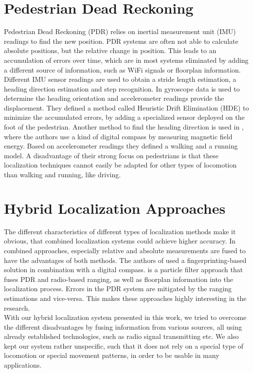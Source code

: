 \section{Pedestrian Dead Reckoning}
Pedestrian Dead Reckoning (PDR) relies on inertial measurement unit (IMU) readings to find the new position. PDR systems are often not able to calculate absolute positions, but the relative change in position. This leads to an accumulation of errors over time, which are in most systems eliminated by adding a different source of information, such as WiFi signals or floorplan information. Different IMU sensor readings are used to obtain a stride length estimation, a heading direction estimation and step recognition. In \cite{Borestein} gyroscope data is used to determine the heading orientation and accelerometer readings provide the displacement. They defined a method called Heuristic Drift Elimination (HDE) to minimize the accumulated errors, by adding a specialized sensor deployed on the foot of the pedestrian. Another method to find the heading direction is used in \cite{Kakiuchi}, where the authors use a kind of digital compass by measuring magnetic field energy. Based on accelerometer readings they defined a walking and a running model. A disadvantage of their strong focus on pedestrians is that these localization techniques cannot easily be adapted for other types of locomotion than walking and running, like driving.  

\section{Hybrid Localization Approaches}
The different characteristics of different types of localization methods make it obvious, that combined localization systems could achieve higher accuracy. In combined approaches, especially relative and absolute measurements are fused to have the advantages of both methods. The authors of \cite{Nagpal} used a fingerprinting-based solution in combination with a digital compass. \cite{Carrera} is a particle filter approach that fuses PDR and radio-based ranging, as well as floorplan information into the localization process. Errors in the PDR system are mitigated by the ranging estimations and vice-versa. This makes these approaches highly interesting in the research.\\
\noindent\hspace*{5mm}%
With our hybrid localization system presented in this work, we tried to overcome the different disadvantages by fusing information from various sources, all using already established technologies, such as radio signal transmitting etc. We also kept our system rather unspecific, such that it does not rely on a special type of locomotion or special movement patterns, in order to be usable in many applications.